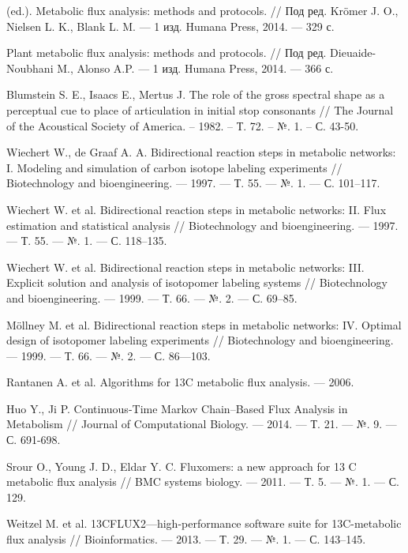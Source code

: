 \documentclass[14pt, a4paper]{extreport}
\begin{document}
\begin{thebibliography}{XXXX}
	(ed.). Metabolic flux analysis: methods and protocols. // Под ред. Krömer J. O., Nielsen L. K., Blank L. M. --- 1 изд. Humana Press, 2014. --- 329 с.
	
	Plant metabolic flux analysis: methods and protocols. // Под ред. Dieuaide-Noubhani M., Alonso A.P. --- 1 изд. Humana Press, 2014. --- 366 с.
	
	Blumstein S. E., Isaacs E., Mertus J. The role of the gross spectral shape as a perceptual cue to place of articulation in initial stop consonants // The Journal of the Acoustical Society of America. – 1982. – Т. 72. – №. 1. – С. 43-50.
	
	Wiechert W., de Graaf A. A. Bidirectional reaction steps in metabolic networks: I. Modeling and simulation of carbon isotope labeling experiments // Biotechnology and bioengineering. --- 1997. --- Т. 55. --- №. 1. --- С. 101--117.
	
	Wiechert W. et al. Bidirectional reaction steps in metabolic networks: II. Flux estimation and statistical analysis // Biotechnology and bioengineering. --- 1997. --- Т. 55. --- №. 1. --- С. 118--135.
	
	Wiechert W. et al. Bidirectional reaction steps in metabolic networks: III. Explicit solution and analysis of isotopomer labeling systems // Biotechnology and bioengineering. --- 1999. --- Т. 66. --- №. 2. --- С. 69--85.
	
	Möllney M. et al. Bidirectional reaction steps in metabolic networks: IV. Optimal design of isotopomer labeling experiments // Biotechnology and bioengineering. --- 1999. --- Т. 66. --- №. 2. --- С. 86---103.
	
	Rantanen A. et al. Algorithms for 13C metabolic flux analysis. --- 2006.
	
	Huo Y., Ji P. Continuous-Time Markov Chain–Based Flux Analysis in Metabolism // Journal of Computational Biology. --- 2014. --- Т. 21. --- №. 9. --- С. 691-698.
	
	Srour O., Young J. D., Eldar Y. C. Fluxomers: a new approach for 13 C metabolic flux analysis // BMC systems biology. --- 2011. --- Т. 5. --- №. 1. --- С. 129.
		
	Weitzel M. et al. 13CFLUX2—high-performance software suite for 13C-metabolic flux analysis // Bioinformatics. --- 2013. --- Т. 29. --- №. 1. --- С. 143--145.
	

\end{thebibliography}
\end{document}

